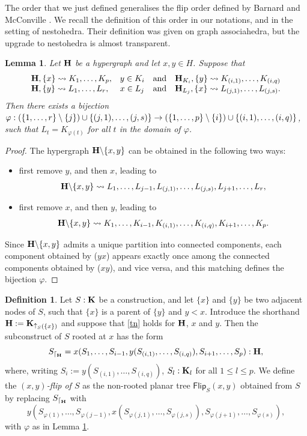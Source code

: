 \documentclass{article}
\theoremstyle{plain}
\newtheorem{lemma}[thm]{Lemma}
\theoremstyle{definition}
\newtheorem{definition}[thm]{Definition}
\newcommand{\set}[1]{\{#1\}}
\newcommand{\hyper}[1]{{\bf #1}}
\newcommand{\restrconstr}[2]{{#1}_{\lceil_{#2}}}
\def\mathraise#1#2#3#4{
\mathchoice
{\raisebox{#2}{$\displaystyle{#1}$}}
{\raisebox{#2}{$#1$}}
{\raisebox{#3}{$\scriptstyle{#1}$}}
{\raisebox{#4}{$\scriptscriptstyle{#1}$}}
}
\def\mathraiseord#1#2#3#4{\mathord{\mathraise#1{#2}{#3}{#4}}}
\def\valup{\mathraiseord{\uparrow}{0.29ex}{0.21ex}{0.16ex}}
\begin{document}
The order that we just defined generalises the flip order defined by Barnard and McConville \cite{BM}. We recall the definition of this order in our notations, and in the setting of nestohedra. Their definition was given on graph associahedra, but the upgrade to nestohedra is almost transparent.
\begin{lemma}\label{twonodes}
Let $\hyper{H}$ be a hypergraph and let $x,y\in H$. Suppose that 
\begin{equation}\begin{array}{llll}
{\bf{H}},\{x\}\leadsto K_1,\ldots , K_p, & y\in K_i & \mbox{and} & {\bf H}_{{K}_i},\{y\}\leadsto K_{(i,1)},\ldots,K_{(i,q)}\\
{\bf{H}},\{y\}\leadsto L_1,\ldots , L_r, & x\in L_j & \mbox{and} & {\bf H}_{{L}_j},\{x\}\leadsto L_{(j,1)},\ldots,L_{(j,s)}.
\end{array}\label{tn}\end{equation} Then there exists a bijection $\varphi: (\set{1,\ldots,r}\setminus\set{j})\cup\set{(j,1),\ldots,(j,s)}\rightarrow \linebreak (\set{1,\ldots,p}\setminus\set{i})\cup\set{(i,1),\ldots,(i,q)}$, such that $L_t=K_{\varphi(t)}$ for all $t$ in the domain of $\varphi$.
\end{lemma}
\begin{proof}
The hypergraph ${\bf H}\backslash\{x,y\}$ can be obtained in the following two ways:
\begin{itemize}
\item[($yx$)] first remove $y$, and then $x$, leading to $${\bf H}\backslash\{x,y\}\leadsto L_1,\ldots ,L_{j-1},L_{(j,1)},\ldots,L_{(j,s)},L_{j+1},\ldots,L_r,$$
\item[($xy$)] first remove $x$, and then $y$, leading to $${\bf H}\backslash\{x,y\}\leadsto K_1,\ldots ,K_{i-1},K_{(i,1)},\ldots,K_{(i,q)},K_{i+1},\ldots,K_p.$$
\end{itemize}
Since ${\bf H}\backslash\{x,y\}$ admits a unique partition into connected components, each component obtained by ($yx$) appears exactly once among the connected components obtained by ($xy$), and vice versa, and this matching defines the bijection $\varphi$.
\end{proof}
 
\begin{definition}\label{fl-cover}
Let $S:\hyper{K}$ be a construction, and let $\{x\}$ and $\{y\}$ be two adjacent nodes of $S$, such that $\{x\}$ is a parent of $\{y\}$ and $y<x$. Introduce the shorthand ${\bf H}:=\hyper{K}_{{\valup_S(\set{x})}}$ and suppose that \eqref{tn} holds for ${\bf H}$, $x$ and $y$. Then the subconstruct of $S$ rooted at $x$ has the form $$\restrconstr{S}{{\bf H}}=x(S_1,\ldots,S_{i-1},y(S_{(i,1)},\ldots, S_{(i,q)}),S_{i+1},\ldots,S_p):\hyper{H},$$ where, writing $S_i:=y(S_{(i,1)},\ldots, S_{(i,q)})$, $S_l:{\bf K}_l$ for all $1\leq l\leq p$.
We define the {\em $(x,y)$-flip of $S$} as the non-rooted planar tree $\mathsf{Flip}_S(x,y)$ obtained from $S$ by replacing $\restrconstr{S}{{\bf H}}$ with $$y(S_{\varphi(1)},\ldots,S_{\varphi(j-1)},x(S_{\varphi(j,1)},\ldots,S_{\varphi(j,s)}),
S_{\varphi(j+1)},\ldots,S_{\varphi(s)}),$$
with $\varphi$ as in Lemma \ref{twonodes}.
\end{definition}
\end{document}
